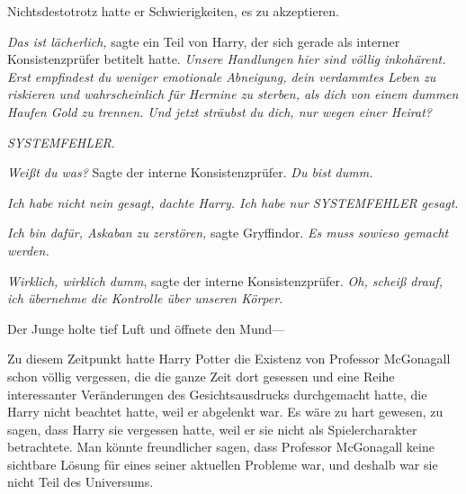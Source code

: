 Nichtsdestotrotz hatte er Schwierigkeiten, es zu akzeptieren.

\emph{Das ist lächerlich,} sagte ein Teil von Harry, der sich gerade als interner Konsistenzprüfer betitelt hatte. \emph{Unsere Handlungen hier sind völlig inkohärent. Erst empfindest du weniger emotionale Abneigung, dein verdammtes \emph{Leben} zu riskieren und wahrscheinlich für Hermine zu \emph{sterben}, als dich von einem dummen Haufen Gold zu trennen. Und jetzt sträubst du dich, nur wegen einer Heirat?}

\emph{SYSTEMFEHLER}.

\emph{Weißt du was?} Sagte der interne Konsistenzprüfer. \emph{Du bist dumm.}

\emph{Ich habe nicht nein gesagt, dachte Harry. Ich habe nur \emph{SYSTEMFEHLER} gesagt}.

\emph{Ich bin dafür, Askaban zu zerstören,} sagte Gryffindor. \emph{Es muss sowieso gemacht werden.}

\emph{Wirklich, wirklich dumm}, sagte der interne Konsistenzprüfer. \emph{Oh, scheiß drauf, ich übernehme die Kontrolle über unseren Körper.}

Der Junge holte tief Luft und öffnete den Mund—

Zu diesem Zeitpunkt hatte Harry Potter die Existenz von Professor McGonagall schon völlig vergessen, die die ganze Zeit dort gesessen und eine Reihe interessanter Veränderungen des Gesichtsausdrucks durchgemacht hatte, die Harry nicht beachtet hatte, weil er abgelenkt war. Es wäre zu hart gewesen, zu sagen, dass Harry sie vergessen hatte, weil er sie nicht als Spielercharakter betrachtete. Man könnte freundlicher sagen, dass Professor McGonagall keine sichtbare Lösung für eines seiner aktuellen Probleme war, und deshalb war sie nicht Teil des Universums.

